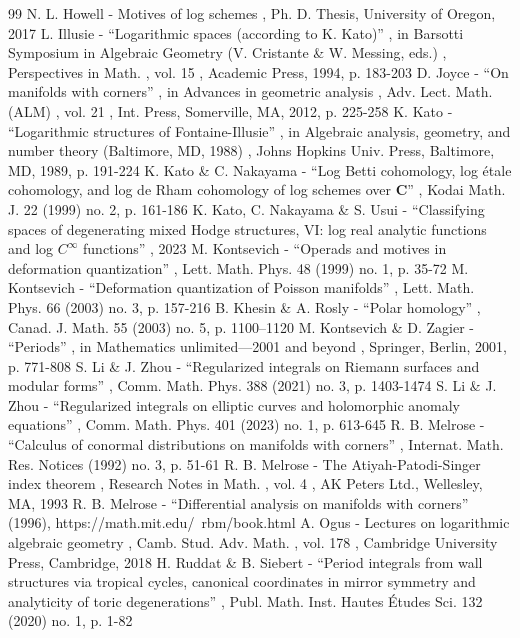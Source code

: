 \documentclass[10pt]{amsart}
\theoremstyle{definition}
\theoremstyle{remark}
\begin{document}
\begin{thebibliography}{99}
 N. L. Howell - Motives of log schemes , Ph. D. Thesis, University of Oregon, 2017
 L. Illusie - “Logarithmic spaces (according to K. Kato)” , in Barsotti Symposium in Algebraic Geometry (V. Cristante \& W. Messing, eds.) , Perspectives in Math. , vol. 15 , Academic Press, 1994, p. 183-203
 D. Joyce - “On manifolds with corners” , in Advances in geometric analysis , Adv. Lect. Math. (ALM) , vol. 21 , Int. Press, Somerville, MA, 2012, p. 225-258
 K. Kato - “Logarithmic structures of Fontaine-Illusie” , in Algebraic analysis, geometry, and number theory (Baltimore, MD, 1988) , Johns Hopkins Univ. Press, Baltimore, MD, 1989, p. 191-224
 K. Kato \& C. Nakayama - “Log Betti cohomology, log étale cohomology, and log de Rham cohomology of log schemes over ${\mathbf{C}}$” , Kodai Math. J. 22 (1999) no. 2, p. 161-186
 K. Kato, C. Nakayama \& S. Usui - “Classifying spaces of degenerating mixed Hodge structures, VI: log real analytic functions and log ${C}^{\infty }$ functions” , 2023
 M. Kontsevich - “Operads and motives in deformation quantization” , Lett. Math. Phys. 48 (1999) no. 1, p. 35-72
 M. Kontsevich - “Deformation quantization of Poisson manifolds” , Lett. Math. Phys. 66 (2003) no. 3, p. 157-216
 B. Khesin \& A. Rosly - “Polar homology” , Canad. J. Math. 55 (2003) no. 5, p. 1100–1120
 M. Kontsevich \& D. Zagier - “Periods” , in Mathematics unlimited—2001 and beyond , Springer, Berlin, 2001, p. 771-808
 S. Li \& J. Zhou - “Regularized integrals on Riemann surfaces and modular forms” , Comm. Math. Phys. 388 (2021) no. 3, p. 1403-1474
 S. Li \& J. Zhou - “Regularized integrals on elliptic curves and holomorphic anomaly equations” , Comm. Math. Phys. 401 (2023) no. 1, p. 613-645
 R. B. Melrose - “Calculus of conormal distributions on manifolds with corners” , Internat. Math. Res. Notices (1992) no. 3, p. 51-61
 R. B. Melrose - The Atiyah-Patodi-Singer index theorem , Research Notes in Math. , vol. 4 , AK Peters Ltd., Wellesley, MA, 1993
 R. B. Melrose - “Differential analysis on manifolds with corners” (1996), https://math.mit.edu/~rbm/book.html
 A. Ogus - Lectures on logarithmic algebraic geometry , Camb. Stud. Adv. Math. , vol. 178 , Cambridge University Press, Cambridge, 2018
 H. Ruddat \& B. Siebert - “Period integrals from wall structures via tropical cycles, canonical coordinates in mirror symmetry and analyticity of toric degenerations” , Publ. Math. Inst. Hautes Études Sci. 132 (2020) no. 1, p. 1-82

\end{thebibliography}
\end{document}
